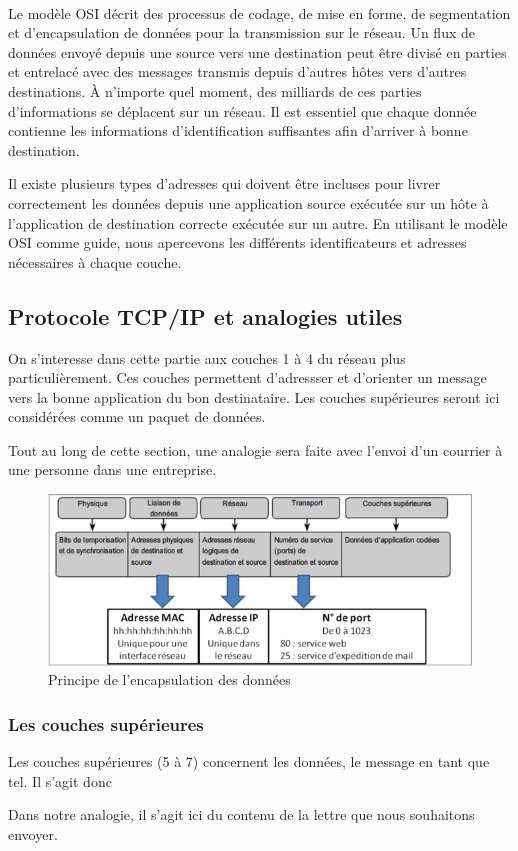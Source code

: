 \documentclass[10pt,fleqn]{article} %
\begin{document}
\paragraph{}
Le modèle OSI décrit des processus de codage, de mise en forme, de segmentation et d'encapsulation de données pour la transmission sur le réseau. Un flux de données envoyé depuis une source vers une destination peut être divisé en parties et entrelacé avec des messages transmis depuis d'autres hôtes vers d'autres destinations. À n'importe quel moment, des milliards de ces parties d'informations se déplacent sur un réseau. Il est essentiel que chaque donnée contienne les informations d'identification suffisantes afin d'arriver à bonne destination.

Il existe plusieurs types d'adresses qui doivent être incluses pour livrer correctement les données depuis une application source exécutée sur un hôte à l'application de destination correcte exécutée sur un autre. En utilisant le modèle OSI comme guide, nous apercevons les différents identificateurs et adresses nécessaires à chaque couche.

\subsection{Protocole TCP/IP et analogies utiles}
On s'interesse dans cette partie aux couches 1 à 4 du réseau plus particulièrement. Ces couches permettent d'adressser et d'orienter un message vers la bonne application du bon destinataire. Les couches supérieures seront ici considérées comme un paquet de données.

Tout au long de cette section, une analogie sera faite avec l'envoi d'un courrier à une personne dans une entreprise.

\begin{figure}[h]
  \centering
  \includegraphics[width=.7\textwidth]{img/reseau_couches_adressage}
  \caption{Principe de l'encapsulation des données}
  \label{fig:res_encap_generique}
\end{figure}

\subsubsection{Les couches supérieures}
Les couches supérieures (5 à 7) concernent les données, le message en tant que tel. Il s'agit donc 
\begin{remark}
  Dans notre analogie, il s'agit ici du contenu de la lettre que nous souhaitons envoyer.
\end{remark}
\end{document}
